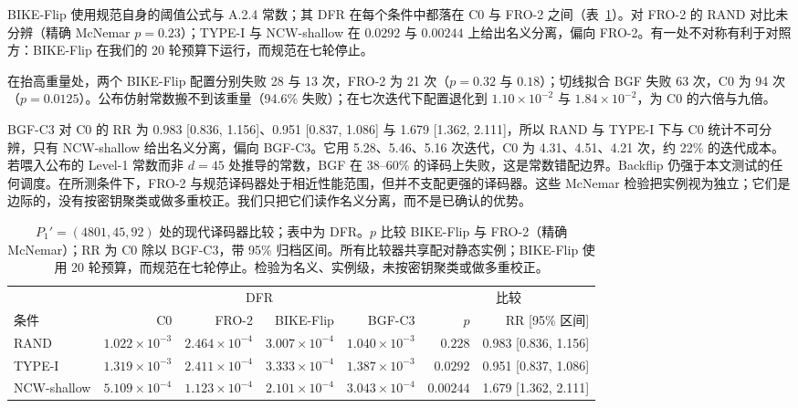 \documentclass[UTF8,a4paper,10pt,twocolumn]{ctexart}
\begin{document}
BIKE-Flip 使用规范自身的阈值公式与 A.2.4 常数；其 DFR 在每个条件中都落在 C0 与 FRO-2 之间（表~\ref{tab:modern}）。对 FRO-2 的 RAND 对比未分辨（精确 McNemar $p=0.23$）；TYPE-I 与 NCW-shallow 在 $0.0292$ 与 $0.00244$ 上给出名义分离，偏向 FRO-2。有一处不对称有利于对照方：BIKE-Flip 在我们的 20 轮预算下运行，而规范在七轮停止。

在抬高重量处，两个 BIKE-Flip 配置分别失败 28 与 13 次，FRO-2 为 21 次（$p=0.32$ 与 $0.18$）；切线拟合 BGF 失败 63 次，C0 为 94 次（$p=0.0125$）。公布仿射常数搬不到该重量（94.6\% 失败）；在七次迭代下配置退化到 $1.10\times10^{-2}$ 与 $1.84\times10^{-2}$，为 C0 的六倍与九倍。

BGF-C3 对 C0 的 RR 为 0.983 [0.836, 1.156]、0.951 [0.837, 1.086] 与 1.679 [1.362, 2.111]，所以 RAND 与 TYPE-I 下与 C0 统计不可分辨，只有 NCW-shallow 给出名义分离，偏向 BGF-C3。它用 5.28、5.46、5.16 次迭代，C0 为 4.31、4.51、4.21 次，约 22\% 的迭代成本。若喂入公布的 Level-1 常数而非 $d=45$ 处推导的常数，BGF 在 38--60\% 的译码上失败，这是常数错配边界。Backflip 仍强于本文测试的任何调度。在所测条件下，FRO-2 与规范译码器处于相近性能范围，但并不支配更强的译码器。这些 McNemar 检验把实例视为独立；它们是边际的，没有按密钥聚类或做多重校正。我们只把它们读作名义分离，而不是已确认的优势。

\begin{table}[!t]
\centering
\small
\caption{$P_1'=(4801,45,92)$ 处的现代译码器比较；表中为 DFR。$p$ 比较 BIKE-Flip 与 FRO-2（精确 McNemar）；RR 为 C0 除以 BGF-C3，带 95\% 归档区间。所有比较器共享配对静态实例；BIKE-Flip 使用 20 轮预算，而规范在七轮停止。检验为名义、实例级，未按密钥聚类或做多重校正。}
\label{tab:modern}
\begin{tabular}{lrrrrrr}
\toprule
 & \multicolumn{4}{c}{DFR} & \multicolumn{2}{c}{比较} \\
\cmidrule(lr){2-5} \cmidrule(lr){6-7}
条件 & C0 & FRO-2 & BIKE-Flip & BGF-C3 & $p$ & RR [95\% 区间] \\
\midrule
RAND & $1.022\times10^{-3}$ & $2.464\times10^{-4}$ & $3.007\times10^{-4}$ & $1.040\times10^{-3}$ & $0.228$ & 0.983 [0.836, 1.156] \\
TYPE-I & $1.319\times10^{-3}$ & $2.411\times10^{-4}$ & $3.333\times10^{-4}$ & $1.387\times10^{-3}$ & $0.0292$ & 0.951 [0.837, 1.086] \\
NCW-shallow & $5.109\times10^{-4}$ & $1.123\times10^{-4}$ & $2.101\times10^{-4}$ & $3.043\times10^{-4}$ & $0.00244$ & 1.679 [1.362, 2.111] \\
\bottomrule
\end{tabular}
\end{table}
\end{document}
